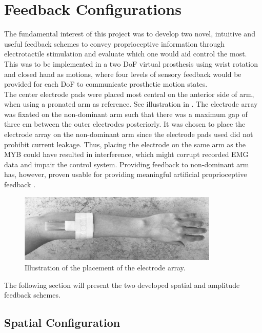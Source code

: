 \section{Feedback Configurations} \label{sec:feed}

The fundamental interest of this project was to develop two novel, intuitive and useful feedback schemes to convey proprioceptive information through electrotactile stimulation and evaluate which one would aid control the most. This was to be implemented in a two DoF virtual prosthesis using wrist rotation and closed hand as motions, where four levels of sensory feedback would be provided for each DoF to communicate prosthetic motion states. \\
The center electrode pads were placed most central on the anterior side of arm, when using a pronated arm as reference. See illustration in . The electrode array was fixated on the non-dominant arm such that there was a maximum gap of three cm between the outer electrodes posteriorly. It was chosen to place the electrode array on the non-dominant arm since the electrode pads used did not prohibit current leakage. Thus, placing the electrode on the same arm as the MYB could have resulted in interference, which might corrupt recorded EMG data and impair the control system. Providing feedback to non-dominant arm has, however, proven usable for providing meaningful artificial proprioceptive feedback \cite{Pistohl2015}.  

\begin{figure}[H]                 
	\includegraphics[width=0.85\textwidth]{figures/elec_place}  
	\caption{Illustration of the placement of the electrode array.}
	\label{fig:meth:elec_place} 
\end{figure} The following section will present the two developed spatial and amplitude feedback schemes. 

\subsection{Spatial Configuration}

